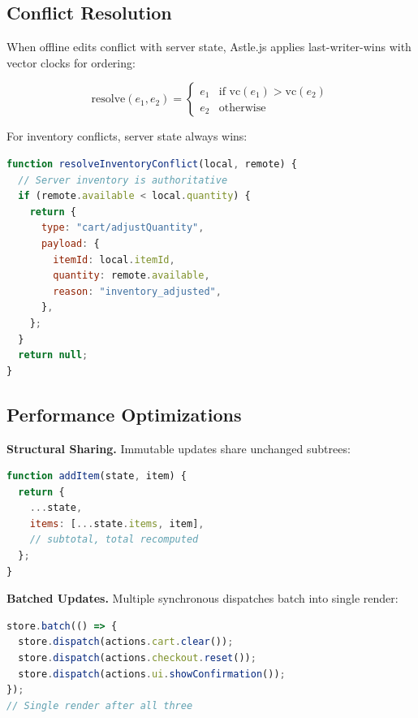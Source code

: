 \documentclass[11pt,twocolumn]{article}
\begin{document}
\subsection{Conflict Resolution}

When offline edits conflict with server state, Astle.js applies last-writer-wins with vector clocks for ordering:

\begin{equation}
\text{resolve}(e_1, e_2) = \begin{cases}
e_1 & \text{if } \text{vc}(e_1) > \text{vc}(e_2) \\
e_2 & \text{otherwise}
\end{cases}
\end{equation}

For inventory conflicts, server state always wins:

\begin{lstlisting}[language=JavaScript,caption=Inventory conflict resolution]
function resolveInventoryConflict(local, remote) {
  // Server inventory is authoritative
  if (remote.available < local.quantity) {
    return {
      type: "cart/adjustQuantity",
      payload: {
        itemId: local.itemId,
        quantity: remote.available,
        reason: "inventory_adjusted",
      },
    };
  }
  return null;
}
\end{lstlisting}

\subsection{Performance Optimizations}

\textbf{Structural Sharing.} Immutable updates share unchanged subtrees:

\begin{lstlisting}[language=JavaScript,caption=Structural sharing]
function addItem(state, item) {
  return {
    ...state,
    items: [...state.items, item],
    // subtotal, total recomputed
  };
}
\end{lstlisting}

\textbf{Batched Updates.} Multiple synchronous dispatches batch into single render:

\begin{lstlisting}[language=JavaScript,caption=Update batching]
store.batch(() => {
  store.dispatch(actions.cart.clear());
  store.dispatch(actions.checkout.reset());
  store.dispatch(actions.ui.showConfirmation());
});
// Single render after all three
\end{lstlisting}
\end{document}
